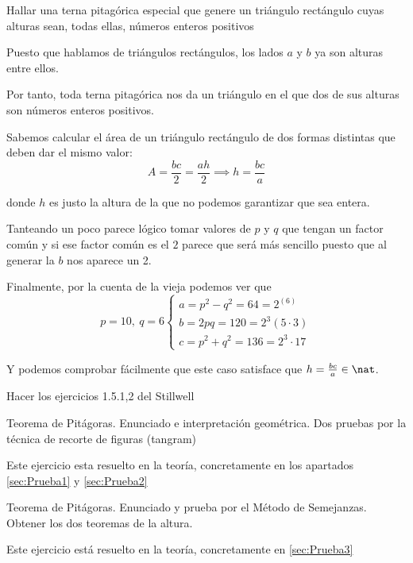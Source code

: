 \begin{problem}[13]
Hallar una terna pitagórica especial que genere un triángulo rectángulo cuyas alturas sean, todas ellas, números enteros positivos
\solution


Puesto que hablamos de triángulos rectángulos, los lados $a$ y $b$ ya son alturas entre ellos.

Por tanto, toda terna pitagórica nos da un triángulo en el que dos de sus alturas son números enteros positivos.

Sabemos calcular el área de un triángulo rectángulo de dos formas distintas que deben dar el mismo valor:
\[A = \frac{bc}{2} = \frac{ah}{2} \implies h = \frac{bc}{a}\]

donde $h$ es justo la altura de la que no podemos garantizar que sea entera.

Tanteando un poco parece lógico tomar valores de $p$ y $q$ que tengan un factor común y si ese factor común es el $2$ parece que será más sencillo puesto que al generar la $b$ nos aparece un 2.

Finalmente, por la cuenta de la vieja podemos ver que
\[p=10, \ q=6\left\{ \begin{array}{l} a=p^2-q^2=64=2^(6) \\ b=2pq=120=2^3(5\cdot 3) \\ c=p^2+q^2=136=2^3\cdot 17 \end{array} \right. \]

Y podemos comprobar fácilmente que este caso satisface que $h=\frac{bc}{a} \in \nat$.
\end{problem}

\begin{problem}[14]
Hacer los ejercicios 1.5.{1,2} del Stillwell
\solution

\end{problem}

\begin{problem}[15]
Teorema de Pitágoras. Enunciado e interpretación geométrica. Dos pruebas por la técnica de recorte de figuras (tangram)
\solution

Este ejercicio esta resuelto en la teoría, concretamente en los apartados \ref{sec:Prueba1} y \ref{sec:Prueba2}
\end{problem}

\begin{problem}[16]
Teorema de Pitágoras. Enunciado y prueba por el Método de Semejanzas. Obtener los dos teoremas de la altura.

\solution

Este ejercicio está resuelto en la teoría, concretamente en \ref{sec:Prueba3}


\end{problem}


